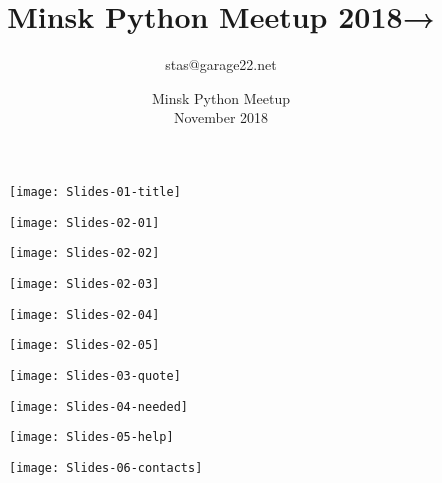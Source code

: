 \documentclass[10pt,pdf,utf8,aspectratio=169,xcolor=dvipsnames,x11names,center]{beamer}
\title{Minsk Python Meetup 2018→}
\author[]{stas@garage22.net}
\date{Minsk Python Meetup\\November 2018}
\begin{document}
\begin{frame}
  \begin{figure}
    \texttt{[image: Slides-01-title]}
  \end{figure}
\end{frame}

\begin{frame}
  \begin{figure}
    \texttt{[image: Slides-02-01]}
  \end{figure}
\end{frame}

\begin{frame}
  \begin{figure}
    \texttt{[image: Slides-02-02]}
  \end{figure}
\end{frame}

\begin{frame}
  \begin{figure}
    \texttt{[image: Slides-02-03]}
  \end{figure}
\end{frame}

\begin{frame}
  \begin{figure}
    \texttt{[image: Slides-02-04]}
  \end{figure}
\end{frame}

\begin{frame}
  \begin{figure}
    \texttt{[image: Slides-02-05]}
  \end{figure}
\end{frame}

\begin{frame}
  \begin{figure}
    \texttt{[image: Slides-03-quote]}
  \end{figure}
\end{frame}

\begin{frame}
  \begin{figure}
    \texttt{[image: Slides-04-needed]}
  \end{figure}
\end{frame}

\begin{frame}
  \begin{figure}
    \texttt{[image: Slides-05-help]}
  \end{figure}
\end{frame}

\begin{frame}
  \begin{figure}
    \texttt{[image: Slides-06-contacts]}
  \end{figure}
\end{frame}
\end{document}
